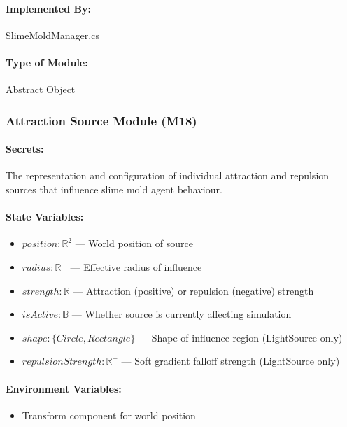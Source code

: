 \documentclass[12pt, titlepage]{article}
\begin{document}
\paragraph{Implemented By:}
SlimeMoldManager.cs

\paragraph{Type of Module:}
Abstract Object

\vspace{10mm}

\subsubsection{Attraction Source Module (M18)} \label{M18}

\paragraph{Secrets:}
The representation and configuration of individual attraction and repulsion sources that
influence slime mold agent behaviour.

\paragraph{State Variables:}
\begin{itemize}
\item $position : \mathbb{R}^2$ --- World position of source
\item $radius : \mathbb{R}^+$ --- Effective radius of influence
\item $strength : \mathbb{R}$ --- Attraction (positive) or repulsion (negative) strength
\item $isActive : \mathbb{B}$ --- Whether source is currently affecting simulation
\item $shape : \{Circle, Rectangle\}$ --- Shape of influence region (LightSource only)
\item $repulsionStrength : \mathbb{R}^+$ --- Soft gradient falloff strength (LightSource only)
\end{itemize}

\paragraph{Environment Variables:}
\begin{itemize}
\item Transform component for world position
\end{itemize}
\end{document}
